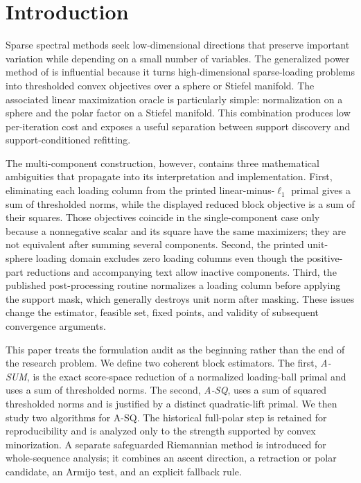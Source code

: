 \section{Introduction}
\label{sec:introduction}
Sparse spectral methods seek low-dimensional directions that preserve important variation while depending on a small number of variables. The generalized power method of \citet{journee2010gpower} is influential because it turns high-dimensional sparse-loading problems into thresholded convex objectives over a sphere or Stiefel manifold. The associated linear maximization oracle is particularly simple: normalization on a sphere and the polar factor on a Stiefel manifold. This combination produces low per-iteration cost and exposes a useful separation between support discovery and support-conditioned refitting.

The multi-component construction, however, contains three mathematical ambiguities that propagate into its interpretation and implementation. First, eliminating each loading column from the printed linear-minus-\(\ell_1\) primal gives a sum of thresholded norms, while the displayed reduced block objective is a sum of their squares. Those objectives coincide in the single-component case only because a nonnegative scalar and its square have the same maximizers; they are not equivalent after summing several components. Second, the printed unit-sphere loading domain excludes zero loading columns even though the positive-part reductions and accompanying text allow inactive components. Third, the published post-processing routine normalizes a loading column before applying the support mask, which generally destroys unit norm after masking. These issues change the estimator, feasible set, fixed points, and validity of subsequent convergence arguments.

This paper treats the formulation audit as the beginning rather than the end of the research problem. We define two coherent block estimators. The first, \emph{A-SUM}, is the exact score-space reduction of a normalized loading-ball primal and uses a sum of thresholded norms. The second, \emph{A-SQ}, uses a sum of squared thresholded norms and is justified by a distinct quadratic-lift primal. We then study two algorithms for A-SQ. The historical full-polar step is retained for reproducibility and is analyzed only to the strength supported by convex minorization. A separate safeguarded Riemannian method is introduced for whole-sequence analysis; it combines an ascent direction, a retraction or polar candidate, an Armijo test, and an explicit fallback rule.

